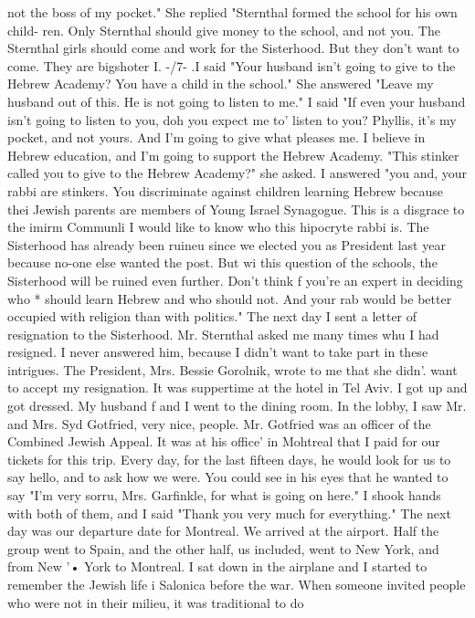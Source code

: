{not the boss of my pocket."
She replied "Sternthal formed the school for his own child-
ren.
Only Sternthal should give money to the school, and not you.
The Sternthal girls 
should come and work for the Sisterhood.
But they don't want to come.
They are bigshoter 
I.
-/7- 
.I said "Your husband isn't going to give to the Hebrew Academy?
You have a child 
in the school."
She answered "Leave my husband out of this.
He is not going to listen 
to me."
I said "If even your husband isn't going to listen to you, doh you expect me to' 
listen to you?
Phyllis, it's my pocket, and not yours.
And I'm going to give what 
pleases me.
I believe in Hebrew education, and I'm going to support the Hebrew Academy.
"This stinker called you to give to the Hebrew Academy?"
she asked.
I answered "you and, 
your rabbi are stinkers.
You discriminate against children learning Hebrew because thei 
Jewish 
parents are members of Young Israel Synagogue.
This is a disgrace to the imirm Communli 
I would like to know who this hipocryte rabbi is.
The Sisterhood has already been ruineu 
since we elected you as President last year because no-one else wanted the post.
But wi 
this question of the schools, the Sisterhood will be ruined even further.
Don't think 
f 
you're an expert in deciding who * should learn Hebrew and who should not.
And your rab 
would be better occupied with religion than with politics."
The next day I sent a letter of resignation to the Sisterhood.
Mr.
Sternthal asked 
me many times whu I had resigned.
I never answered him, because I didn't want to take 
part in these intrigues.
The President, Mrs.
Bessie Gorolnik, wrote to me that she didn'.
want to accept my resignation.
It was suppertime at the hotel in Tel Aviv.
I got up and got dressed.
My husband f 
and I went to the dining room.
In the lobby, I saw Mr.
and Mrs.
Syd Gotfried, very nice, 
people.
Mr.
Gotfried was an officer of the Combined Jewish Appeal.
It was at his office' 
in Mohtreal that I paid for our tickets for this trip.
Every day, for the last fifteen 
days, he would look for us to say hello, and to ask how we were.
You could see in his 
eyes that he wanted to say "I'm very sorru, Mrs.
Garfinkle, for what is going on here."
I shook hands with both of them, and I said "Thank you very much for everything."
The next day was our departure date for Montreal.
We arrived at the airport.
Half 
the group went to Spain, and the other half, us included, went to New York, and from New '• 
York to Montreal.
I sat down in the airplane and I started to remember the Jewish life i 
Salonica before the war.
When someone invited people who were not in their milieu, it was traditional to do 
}
